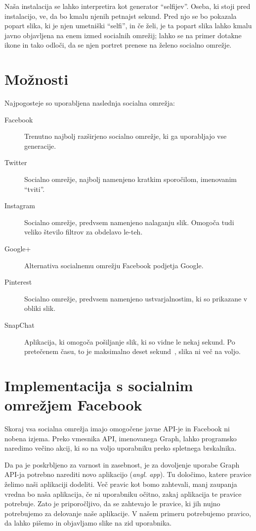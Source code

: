 \documentclass[a4paper, 12pt]{book}
\begin{document}
Naša instalacija se lahko interpretira kot generator ``selfijev''. Oseba, ki
stoji pred instalacijo, ve, da bo kmalu njenih petnajst sekund. Pred njo se bo
pokazala popart slika, ki je njen umetniški ``selfi'', in če želi, je ta
popart slika lahko kmalu javno objavljena na enem izmed socialnih omrežij; lahko
se na primer dotakne ikone in tako odloči, da se njen portret prenese na želeno
socialno omrežje.

\pagebreak


\section{Možnosti}
Najpogosteje so uporabljena naslednja socialna omrežja:
\begin{description}
\item[Facebook]
Trenutno najbolj razširjeno socialno omrežje, ki ga uporabljajo vse
generacije.

\item[Twitter]
Socialno omrežje, najbolj namenjeno kratkim sporočilom, imenovanim ``tviti''.

\item[Instagram]
Socialno omrežje, predvsem namenjeno nalaganju slik. Omo\-go\-ča tudi veliko
število filtrov za obdelavo le-teh.

\item[Google+]
Alternativa socialnemu omrežju Facebook podjetja Google.

\item[Pinterest]
Socialno omrežje, predvsem namenjeno ustvarjalnostim, ki so prikazane v obliki
slik.

\item[SnapChat]
Aplikacija, ki omogoča pošiljanje slik, ki so vidne le nekaj sekund. Po
pretečenem času, to je maksimalno deset sekund~\cite{wiki:SnapChat}, slika ni
več na voljo.
\end{description}


\section{Implementacija s socialnim omrežjem Facebook}
Skoraj vsa socialna omrežja imajo omogočene javne API-je in Facebook ni nobena
izjema. Preko vmesnika API, imenovanega Graph, lahko programsko naredimo
večino akcij, ki so na voljo uporabniku preko spletnega brskalnika.

Da pa je poskrbljeno za varnost in zasebnost, je za dovoljenje uporabe Graph
API-ja potrebno narediti novo aplikacijo (\textit{angl. app}). Tu določimo,
katere pravice želimo naši aplikaciji dodeliti. Več pravic kot bomo
zahtevali, manj zaupanja vredna bo naša aplikacija, če ni uporabniku očitno,
zakaj aplikacija te pravice potrebuje. Zato je priporočljivo, da se zahtevajo
le pravice, ki jih nujno potrebujemo za delovanje naše aplikacije. V našem
primeru potrebujemo pravico, da lahko pišemo in objavljamo slike na zid
uporabnika.
\end{document}
